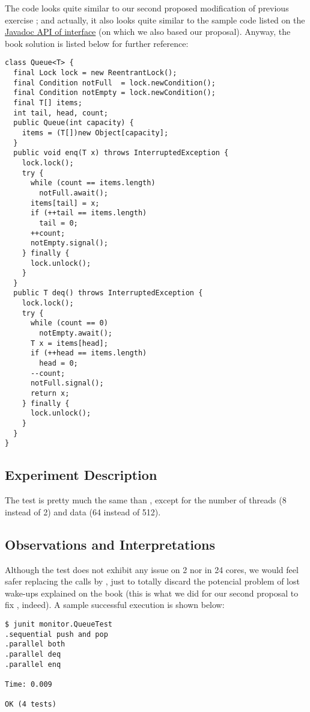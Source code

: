The code looks quite similar to our second proposed modification of previous
exercise ; and actually, it also looks quite
similar to the sample code listed on the \href{http://docs.oracle.com/javase/7/docs/api/java/util/concurrent/locks/Condition.html}{Javadoc API of 
  interface} (on which we also based our proposal). Anyway, the book
solution is listed below for further reference: \\

\begin{lstlisting}[style=numbers]
class Queue<T> {
  final Lock lock = new ReentrantLock();
  final Condition notFull  = lock.newCondition();
  final Condition notEmpty = lock.newCondition();  
  final T[] items; 
  int tail, head, count;  
  public Queue(int capacity) {
    items = (T[])new Object[capacity];
  }
  public void enq(T x) throws InterruptedException {
    lock.lock();
    try {
      while (count == items.length)
        notFull.await();
      items[tail] = x;
      if (++tail == items.length)
        tail = 0;
      ++count;
      notEmpty.signal();
    } finally {
      lock.unlock();
    }
  }  
  public T deq() throws InterruptedException {
    lock.lock();
    try {
      while (count == 0)
        notEmpty.await();
      T x = items[head];
      if (++head == items.length)
        head = 0;
      --count;
      notFull.signal();
      return x;
    } finally {
      lock.unlock();
    }
  }
}
\end{lstlisting}
\hfill

\subsection{Experiment Description}

The test is pretty much the same than , except
for the number of threads (8 instead of 2) and data (64 instead of
512). 

\subsection{Observations and Interpretations}
Although the test does not exhibit any issue on 2 nor in 24 cores, we
would feel safer replacing the  calls by , just
to totally discard the potencial problem of lost wake-ups explained on
the book (this is what we did for our second proposal to fix
, indeed). A sample successful execution is shown
below: \\ 

\begin{verbatim}
$ junit monitor.QueueTest
.sequential push and pop
.parallel both
.parallel deq
.parallel enq

Time: 0.009

OK (4 tests)
\end{verbatim}
\hfill

